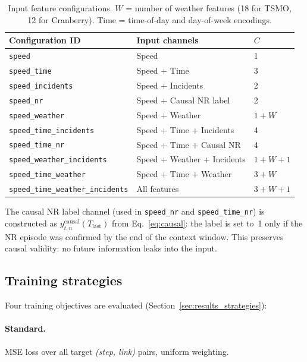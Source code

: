 \documentclass[a4paper]{cas-sc}
\begin{document}
\begin{table}[h]
\centering
\caption{Input feature configurations.
         $W$ = number of weather features (18 for TSMO, 12 for Cranberry).
         Time = time-of-day and day-of-week encodings.}
\label{tab:feature_configs}
\small
\begin{tabular}{lll}
\toprule
Configuration ID & Input channels & $C$ \\
\midrule
\texttt{speed}                       & Speed & 1 \\
\texttt{speed\_time}                 & Speed + Time & 3 \\
\texttt{speed\_incidents}            & Speed + Incidents & 2 \\
\texttt{speed\_nr}                   & Speed + Causal NR label & 2 \\
\texttt{speed\_weather}              & Speed + Weather & $1{+}W$ \\
\texttt{speed\_time\_incidents}      & Speed + Time + Incidents & 4 \\
\texttt{speed\_time\_nr}             & Speed + Time + Causal NR & 4 \\
\texttt{speed\_weather\_incidents}   & Speed + Weather + Incidents & $1{+}W{+}1$ \\
\texttt{speed\_time\_weather}        & Speed + Time + Weather & $3{+}W$ \\
\texttt{speed\_time\_weather\_incidents} & All features & $3{+}W{+}1$ \\
\bottomrule
\end{tabular}
\end{table}

The causal NR label channel (used in \texttt{speed\_nr} and
\texttt{speed\_time\_nr}) is constructed as
$y^{\mathrm{causal}}_{t,n}(T_{\mathrm{last}})$ from
Eq.~\eqref{eq:causal}: the label is set to~1 only if the NR episode
was confirmed by the end of the context window.
This preserves causal validity: no future information leaks into the
input.

\subsection{Training strategies}
\label{sec:strategies}

Four training objectives are evaluated (Section~\ref{sec:results_strategies}):

\paragraph{Standard.}
MSE loss over all target \textit{(step, link)} pairs, uniform weighting.
\end{document}
